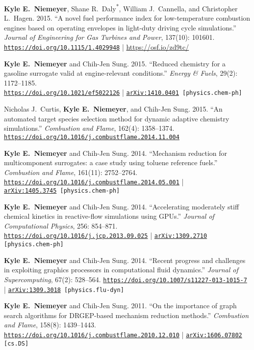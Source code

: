 \documentclass[margin,line,11pt]{res}
\makeatletter
\newlength{\bibhang}
\newlength{\bibsep}
 {\@listi \global\bibsep\itemsep \global\advance\bibsep by\parsep}
\newenvironment{bibenum*}
  {\renewcommand\labelenumi{\theenumi.}%
   \etaremune[
     topsep=0pt,
     itemsep=\bibsep,
     parsep=0pt,partopsep=0pt,
     itemindent=-\bibhang,
     leftmargin={\bibhang+\widthof{[999]}}]}
  {\endetaremune}
\newcommand*{\doi}[1]{\href{https://doi.org/#1}{\nolinkurl{https://doi.org/#1}}}
\newcommand*{\grad}[0]{\textsuperscript{*}}
\makeatother
\begin{document}
\begin{resume}
\begin{bibenum*}
\item \textbf{Kyle E.~Niemeyer}, Shane R.\ Daly\grad{}, William J.\ Cannella, and Christopher L.\ Hagen.
2015.
``A novel fuel performance index for low-temperature combustion engines based on operating envelopes in light-duty driving cycle simulations.''
\emph{Journal of Engineering for Gas Turbines and Power}, 137(10): 101601.
\doi{10.1115/1.4029948} | \url{https://osf.io/zd9tc/}

\item \textbf{Kyle E.~Niemeyer} and Chih-Jen Sung.
2015.
``Reduced chemistry for a gasoline surrogate valid at engine-relevant conditions.''
\emph{Energy \& Fuels}, 29(2): 1172--1185. \\
\doi{10.1021/ef5022126} |
{\tt \href{https://arxiv.org/abs/1410.0401}{arXiv:1410.0401} [physics.chem-ph]}

\item Nicholas J.\ Curtis, \textbf{Kyle E.~Niemeyer}, and Chih-Jen Sung.
2015.
``An automated target species selection method for dynamic adaptive chemistry simulations.''
\emph{Combustion and Flame}, 162(4): 1358--1374.
\doi{10.1016/j.combustflame.2014.11.004}

\item \textbf{Kyle E.~Niemeyer} and Chih-Jen Sung.
2014.
``Mechanism reduction for multicomponent surrogates: a case study using toluene reference fuels.''
\emph{Combustion and Flame}, 161(11): 2752--2764.
\doi{10.1016/j.combustflame.2014.05.001} | \\
{\tt \href{https://arxiv.org/abs/1405.3745}{arXiv:1405.3745} [physics.chem-ph]}

\item \textbf{Kyle E.~Niemeyer} and Chih-Jen Sung.
2014.
``Accelerating moderately stiff chemical kinetics in reactive-flow simulations using GPUs.''
\emph{Journal of Computational Physics}, 256: 854--871. \\
\doi{10.1016/j.jcp.2013.09.025} |
{\tt \href{https://arxiv.org/abs/1309.2710}{arXiv:1309.2710} [physics.chem-ph]}

\item \textbf{Kyle E.~Niemeyer} and Chih-Jen Sung.
2014.
``Recent progress and challenges in exploiting graphics processors in computational fluid dynamics.''
\emph{Journal of Supercomputing}, 67(2): 528--564.
\doi{10.1007/s11227-013-1015-7} |
{\tt \href{https://arxiv.org/abs/1309.3018}{arXiv:1309.3018} [physics.flu-dyn]}

\item \textbf{Kyle E.~Niemeyer} and Chih-Jen Sung.
2011.
``On the importance of graph search algorithms for DRGEP-based mechanism reduction methods.''
\emph{Combustion and Flame}, 158(8): 1439--1443.
\doi{10.1016/j.combustflame.2010.12.010} |
{\tt \href{https://arxiv.org/abs/1606.07802}{arXiv:1606.07802} [cs.DS]}


\end{bibenum*}
\end{resume}
\end{document}
